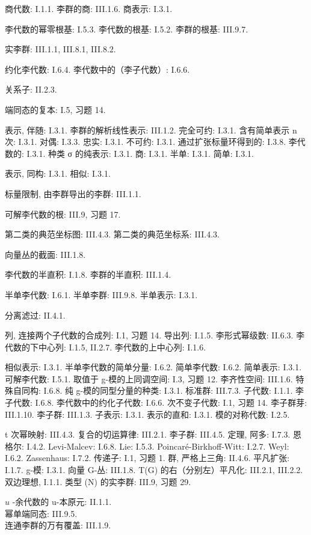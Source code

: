 商代数: I.1.1. 李群的商: III.1.6. 商表示: I.3.1.

李代数的幂零根基: I.5.3. 李代数的根基: I.5.2. 李群的根基: III.9.7.

实李群: III.1.1, III.8.1, III.8.2.

约化李代数: I.6.4. 李代数中的（李子代数）: I.6.6.

关系子: II.2.3.

端同态的复本: I.5, 习题 14.

表示, 伴随: I.3.1. 李群的解析线性表示: III.1.2. 完全可约: I.3.1. 含有简单表示 n 次: I.3.1. 对偶: I.3.3. 忠实: I.3.1. 不可约: I.3.1. 通过扩张标量环得到的: I.3.8. 李代数的: I.3.1. 种类 σ 的纯表示: I.3.1. 商: I.3.1. 半单: I.3.1. 简单: I.3.1.

表示, 同构: I.3.1. 相似: I.3.1.

标量限制, 由李群导出的李群: III.1.1.

可解李代数的根: III.9, 习题 17.

第二类的典范坐标图: III.4.3. 第二类的典范坐标系: III.4.3.

向量丛的截面: III.1.8.

李代数的半直积: I.1.8. 李群的半直积: III.1.4.

半单李代数: I.6.1. 半单李群: III.9.8. 半单表示: I.3.1.

分离滤过: II.4.1.

列, 连接两个子代数的合成列: I.1, 习题 14. 导出列: I.1.5. 李形式幂级数: II.6.3. 李代数的下中心列: I.1.5, II.2.7. 李代数的上中心列: I.1.6.

相似表示: I.3.1. 半单李代数的简单分量: I.6.2. 简单李代数: I.6.2. 简单表示: I.3.1. 可解李代数: I.5.1. 取值于 g-模的上同调空间: I.3, 习题 12. 李齐性空间: III.1.6. 特殊自同构: I.6.8. 纯 g-模的同型分量的种类: I.3.1. 标准群: III.7.3. 子代数: I.1.1. 李子代数: I.6.8. 李代数中的约化子代数: I.6.6. 次不变子代数: I.1, 习题 14. 李子群芽: III.1.10. 李子群: III.1.3. 子表示: I.3.1. 表示的直和: I.3.1. 模的对称代数: I.2.5.

t 次幂映射: III.4.3. 复合的切运算律: III.2.1. 李子群: III.4.5. 定理, 阿多: I.7.3. 恩格尔: I.4.2. Levi-Malcev: I.6.8. Lie: I.5.3. Poincaré-Birkhoff-Witt: I.2.7. Weyl: I.6.2. Zassenhaus: I.7.2. 传递子: I.1, 习题 1. 群, 严格上三角: II.4.6. 平凡扩张: I.1.7. g-模: I.3.1. 向量 G-丛: III.1.8. T(G) 的右（分别左）平凡化: III.2.1, III.2.2. 双边理想, I.1.1. 类型 (N) 的实李群: III.9, 习题 29.

\(u\) -余代数的 u-本原元: II.1.1.\\
幂单端同态: III.9.5.\\
连通李群的万有覆盖: III.1.9.

